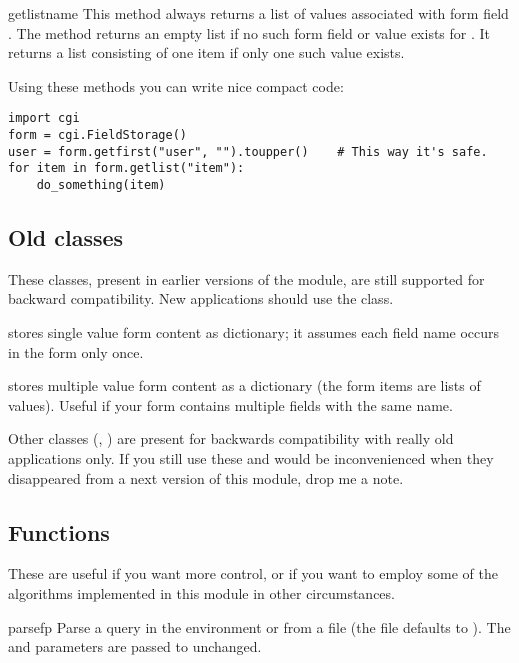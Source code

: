 \begin{methoddesc}[FieldStorage]{getlist}{name}
  This method always returns a list of values associated with form
  field .  The method returns an empty list if no such form
  field or value exists for .  It returns a list consisting
  of one item if only one such value exists.
\end{methoddesc}

Using these methods you can write nice compact code:

\begin{verbatim}
import cgi
form = cgi.FieldStorage()
user = form.getfirst("user", "").toupper()    # This way it's safe.
for item in form.getlist("item"):
    do_something(item)
\end{verbatim}


\subsection{Old classes}

These classes, present in earlier versions of the  module,
are still supported for backward compatibility.  New applications
should use the  class.

 stores single value form content as
dictionary; it assumes each field name occurs in the form only once.

 stores multiple value form content as a
dictionary (the form items are lists of values).  Useful if your form
contains multiple fields with the same name.

Other classes (, ) are
present for backwards compatibility with really old applications only.
If you still use these and would be inconvenienced when they
disappeared from a next version of this module, drop me a note.


\subsection{Functions}

These are useful if you want more control, or if you want to employ
some of the algorithms implemented in this module in other
circumstances.

\begin{funcdesc}{parse}{fp}
  Parse a query in the environment or from a file (the file defaults
  to ).  The  and
   parameters are passed to 
  unchanged.
\end{funcdesc}

